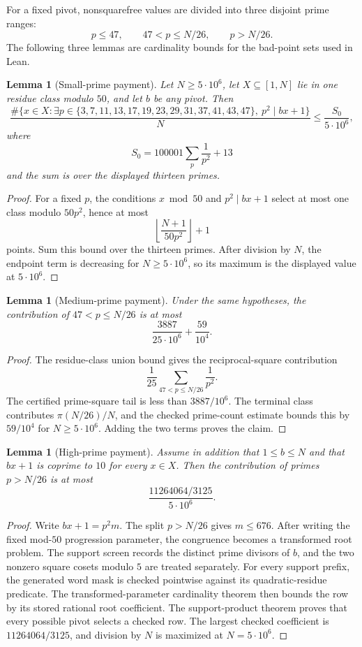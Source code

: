 \documentclass[11pt]{article}
\newtheorem{lemma}[theorem]{Lemma}
\theoremstyle{definition}
\newcommand{\FiveMillion}{5\cdot10^6}
\begin{document}
For a fixed pivot, nonsquarefree values are divided into three disjoint
prime ranges:
\[
 p\leq47,\qquad 47<p\leq N/26,\qquad p>N/26.
\]
The following three lemmas are cardinality bounds for the bad-point
sets used in Lean.

\begin{lemma}[Small-prime payment]\label{lem:pure-global-small}
Let $N\geq\FiveMillion$, let $X\subseteq[1,N]$ lie in one residue class
modulo $50$, and let $b$ be any pivot.  Then
\[
 \frac{\#\{x\in X:\exists p\in
 \{3,7,11,13,17,19,23,29,31,37,41,43,47\},\
 p^2\mid bx+1\}}{N}
 \leq \frac{S_0}{\FiveMillion},
\]
where
\[
 S_0=100001\sum_{p}\frac1{p^2}+13
\]
and the sum is over the displayed thirteen primes.
\end{lemma}

\begin{proof}
For a fixed $p$, the conditions $x\bmod50$ and $p^2\mid bx+1$ select at
most one class modulo $50p^2$, hence at most
\[
 \left\lfloor\frac{N+1}{50p^2}\right\rfloor+1
\]
points.  Sum this bound over the thirteen primes.  After division by $N$,
the endpoint term is decreasing for $N\geq\FiveMillion$, so its maximum is
the displayed value at $\FiveMillion$.
\end{proof}

\begin{lemma}[Medium-prime payment]\label{lem:pure-global-medium}
Under the same hypotheses, the contribution of
$47<p\leq N/26$ is at most
\[
 \frac{3887}{25\cdot10^6}+\frac{59}{10^4}.
\]
\end{lemma}

\begin{proof}
The residue-class union bound gives the reciprocal-square contribution
\[
 \frac1{25}\sum_{47<p\leq N/26}\frac1{p^2}.
\]
The certified prime-square tail is less than $3887/10^6$.  The terminal
class contributes $\pi(N/26)/N$, and the checked prime-count estimate bounds
this by $59/10^4$ for $N\geq\FiveMillion$.  Adding the two terms proves the
claim.
\end{proof}

\begin{lemma}[High-prime payment]\label{lem:pure-global-high}
Assume in addition that $1\leq b\leq N$ and that $bx+1$ is coprime to $10$
for every $x\in X$.  Then the contribution of primes $p>N/26$ is at most
\[
 \frac{11264064/3125}{\FiveMillion}.
\]
\end{lemma}

\begin{proof}
Write $bx+1=p^2m$.  The split $p>N/26$ gives $m\leq676$.  After writing the
fixed mod-$50$ progression parameter, the congruence becomes a transformed
root problem.  The support screen records the distinct prime divisors of
$b$, and the two nonzero square cosets modulo $5$ are treated separately.
For every support prefix, the generated word mask is checked pointwise
against its quadratic-residue predicate.  The transformed-parameter
cardinality theorem then bounds the row by its stored rational root
coefficient.  The support-product theorem proves that every possible pivot
selects a checked row.  The largest checked coefficient is
$11264064/3125$, and division by $N$ is maximized at
$N=\FiveMillion$.
\end{proof}
\end{document}
